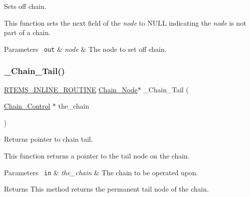 Sets off chain. 

This function sets the next field of the {\itshape node} to N\+U\+LL indicating the {\itshape node} is not part of a chain.


\begin{DoxyParams}[1]{Parameters}
\mbox{\texttt{ out}}  & {\em node} & The node to set off chain. \\
\hline
\end{DoxyParams}
\mbox{\label{group__RTEMSScoreChain_ga06f3e2dd6d64411f0565e3b483e53673}} 
\subsubsection{\texorpdfstring{\_Chain\_Tail()}{\_Chain\_Tail()}}
{\footnotesize\ttfamily \mbox{\hyperlink{group__RTEMSScoreBaseDefs_gac216239df231d5dbd15e3520b0b9313f}{R\+T\+E\+M\+S\+\_\+\+I\+N\+L\+I\+N\+E\+\_\+\+R\+O\+U\+T\+I\+NE}} \mbox{\hyperlink{group__RTEMSScoreChain_ga0dd4bfcca1ac7f90de2842e447846d3d}{Chain\+\_\+\+Node}}$\ast$ \+\_\+\+Chain\+\_\+\+Tail (\begin{DoxyParamCaption}\item[{\mbox{\hyperlink{unionChain__Control}{Chain\+\_\+\+Control}} $\ast$}]{the\+\_\+chain }\end{DoxyParamCaption})}



Returns pointer to chain tail. 

This function returns a pointer to the tail node on the chain.


\begin{DoxyParams}[1]{Parameters}
\mbox{\texttt{ in}}  & {\em the\+\_\+chain} & The chain to be operated upon.\\
\hline
\end{DoxyParams}
\begin{DoxyReturn}{Returns}
This method returns the permanent tail node of the chain. 
\end{DoxyReturn}

